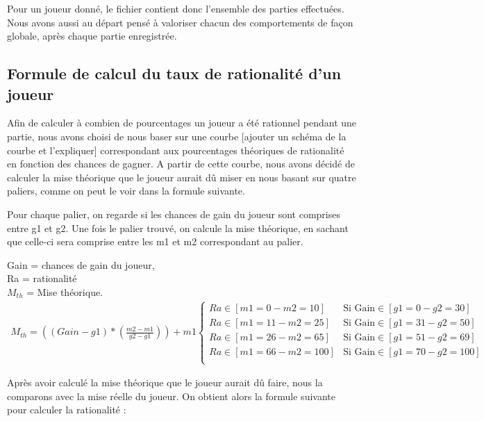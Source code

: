 \documentclass{report}
\begin{document}
Pour un joueur donné, le fichier contient donc l'ensemble des parties effectuées. Nous avons aussi au départ pensé à valoriser chacun des comportements de façon globale, après chaque partie enregistrée.


\subsection{Formule de calcul du taux de rationalité d'un joueur}

\hspace{0.5cm}Afin de calculer à combien de pourcentages un joueur a été rationnel pendant une partie, nous avons choisi de nous baser sur une courbe [ajouter un schéma de la courbe et l'expliquer] correspondant aux pourcentages théoriques de rationalité en fonction des chances de gagner. A partir de cette courbe, nous avons décidé de calculer la mise théorique que le joueur aurait dû miser en nous basant sur quatre paliers, comme on peut le voir dans la formule suivante. \par
Pour chaque palier, on regarde si les chances de gain du joueur sont comprises entre g1 et g2. Une fois le palier trouvé, on calcule la mise théorique, en sachant que celle-ci sera comprise entre les m1 et m2 correspondant au palier. \par
	Gain = chances de gain du joueur,\\
	Ra = rationalité\\
	$M_{th}$ = Mise théorique.\\

\small{
\begin{align*}
	M_{th} = \left((Gain - g1) * \left(\frac{m2-m1}{g2-g1}\right)\right)+m1
	\begin{cases}
		Ra \in [m1=0 - m2=10] &\text{Si Gain} \in [g1=0 - g2=30]\\
		Ra \in [m1=11 - m2=25] &\text{Si Gain} \in [g1=31 - g2=50]\\
		Ra \in [m1=26 - m2=65] &\text{Si Gain} \in [g1=51 - g2=69]\\
		Ra \in [m1=66 - m2=100] &\text{Si Gain} \in [g1=70 - g2=100]\\
	\end{cases}
\end{align*}
}

Après avoir calculé la mise théorique que le joueur aurait dû faire, nous la comparons avec la mise réelle du joueur. On obtient alors la formule suivante pour calculer la rationalité : \par
\end{document}
